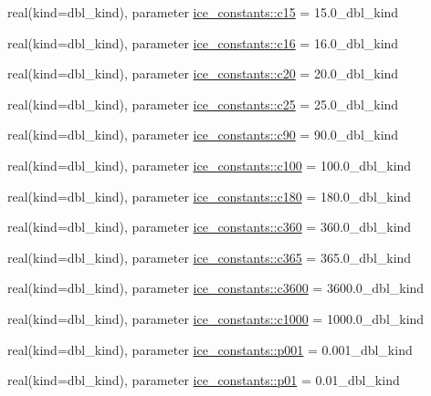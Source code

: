 \begin{DoxyCompactItemize}
\item 
real(kind=dbl\_\-kind), parameter \hyperlink{namespaceice__constants_a7ea763e48f3b0d07e97e411c1abd6da1}{ice\_\-constants::c15} = 15.0\_\-dbl\_\-kind
\item 
real(kind=dbl\_\-kind), parameter \hyperlink{namespaceice__constants_aaa41418681ab232e158cb3a792321df8}{ice\_\-constants::c16} = 16.0\_\-dbl\_\-kind
\item 
real(kind=dbl\_\-kind), parameter \hyperlink{namespaceice__constants_a19a6a387f7968c6067c1ff9c1d5f0b45}{ice\_\-constants::c20} = 20.0\_\-dbl\_\-kind
\item 
real(kind=dbl\_\-kind), parameter \hyperlink{namespaceice__constants_a5db59b63c17c3ed647e3cdd61b04793c}{ice\_\-constants::c25} = 25.0\_\-dbl\_\-kind
\item 
real(kind=dbl\_\-kind), parameter \hyperlink{namespaceice__constants_ab5bd5778b3d35bf4689b364fdb86f852}{ice\_\-constants::c90} = 90.0\_\-dbl\_\-kind
\item 
real(kind=dbl\_\-kind), parameter \hyperlink{namespaceice__constants_a64d8a1f5f872985a8ef291758a414275}{ice\_\-constants::c100} = 100.0\_\-dbl\_\-kind
\item 
real(kind=dbl\_\-kind), parameter \hyperlink{namespaceice__constants_a4090f4acc886fcf5ff13e21846607eca}{ice\_\-constants::c180} = 180.0\_\-dbl\_\-kind
\item 
real(kind=dbl\_\-kind), parameter \hyperlink{namespaceice__constants_a36d55ec278e51e0964603b90df1aa54c}{ice\_\-constants::c360} = 360.0\_\-dbl\_\-kind
\item 
real(kind=dbl\_\-kind), parameter \hyperlink{namespaceice__constants_af62bc1ea152c6785b0994e700eef3645}{ice\_\-constants::c365} = 365.0\_\-dbl\_\-kind
\item 
real(kind=dbl\_\-kind), parameter \hyperlink{namespaceice__constants_aa44b288005725c33c91c21cc15751b54}{ice\_\-constants::c3600} = 3600.0\_\-dbl\_\-kind
\item 
real(kind=dbl\_\-kind), parameter \hyperlink{namespaceice__constants_a489137702b8f265b58dc91f04e4145d4}{ice\_\-constants::c1000} = 1000.0\_\-dbl\_\-kind
\item 
real(kind=dbl\_\-kind), parameter \hyperlink{namespaceice__constants_a32bc94e42275169979f5be642d23634e}{ice\_\-constants::p001} = 0.001\_\-dbl\_\-kind
\item 
real(kind=dbl\_\-kind), parameter \hyperlink{namespaceice__constants_a985c2a8f778734c09e77d0a0cdaaa190}{ice\_\-constants::p01} = 0.01\_\-dbl\_\-kind
\item 

\end{DoxyCompactItemize}

